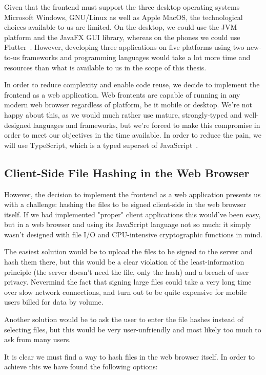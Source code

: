 Given that the frontend must support the three desktop operating systems Microsoft Windows, GNU/Linux as well as Apple MacOS,
the technological choices available to us are limited.
On the desktop, we could use the \gls{JVM} platform and the JavaFX \gls{GUI} library, whereas on the phones
we could use Flutter~\cite{flutterframework}.
However, developing three applications on five platforms using two new-to-us frameworks and programming languages
would take a lot more time and resources than what is available to us in the scope of this thesis.

In order to reduce complexity and enable code reuse, we decide to implement the frontend as a web application.
Web frontents are capable of running in any modern web browser regardless of platform, be it mobile or desktop.
We're not happy about this, as we would much rather use mature, strongly-typed and well-designed languages and frameworks,
but we're forced to make this compromise in order to meet our objectives in the time available.
In order to reduce the pain, we will use TypeScript, which is a typed superset of JavaScript~\cite{loltypes}.

\subsection{Client-Side File Hashing in the Web Browser}
\label{subsec:browserhashing}
However, the decision to implement the frontend as a web application presents us with a challenge:
hashing the files to be signed client-side in the web browser itself.
If we had implemented "proper" client applications this would've been easy, but in a web browser and using its
JavaScript language not so much: it simply wasn't designed with file I/O and CPU-intensive cryptographic functions in mind.

The easiest solution would be to upload the files to be signed to the server and hash them there,
but this would be a clear violation of the least-information principle (the server doesn't need the file, only the hash)
and a breach of user privacy.
Nevermind the fact that signing large files could take a very long time over slow network connections,
and turn out to be quite expensive for mobile users billed for data by volume.

Another solution would be to ask the user to enter the file hashes instead of selecting files,
but this would be very user-unfriendly and most likely too much to ask from many users.

It is clear we must find a way to hash files in the web browser itself.
In order to achieve this we have found the following options:


